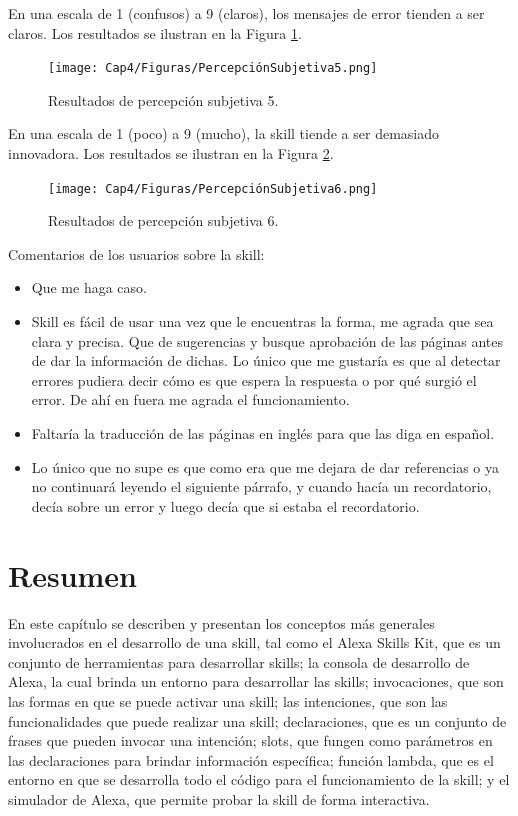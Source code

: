 En una escala de 1 (confusos) a 9 (claros), los mensajes de error tienden a ser claros. Los resultados se ilustran en la Figura \ref{fig:430}.

\begin{figure}[H]
  \centering
  \texttt{[image: Cap4/Figuras/PercepciónSubjetiva5.png]}
  \caption{Resultados de percepción subjetiva 5.}
  \label{fig:430}
\end{figure}

En una escala de 1 (poco) a 9 (mucho), la skill tiende a ser demasiado innovadora. Los resultados se ilustran en la Figura \ref{fig:431}.

\begin{figure}[H]
  \centering
  \texttt{[image: Cap4/Figuras/PercepciónSubjetiva6.png]}
  \caption{Resultados de percepción subjetiva 6.}
  \label{fig:431}
\end{figure}

Comentarios de los usuarios sobre la skill:

\begin{itemize}
  \item Que me haga caso.
  \item Skill es fácil de usar una vez que le encuentras la forma, me agrada que sea clara y precisa. Que de sugerencias y busque aprobación de las páginas antes de dar la información de dichas. Lo único que me gustaría es que al detectar errores pudiera decir cómo es que espera la respuesta o por qué surgió el error. De ahí en fuera me agrada el funcionamiento.
  \item Faltaría la traducción de las páginas en inglés para que las diga en español.
  \item Lo único que no supe es que como era que me dejara de dar referencias o ya no continuará leyendo el siguiente párrafo, y cuando hacía un recordatorio, decía sobre un error y luego decía que si estaba el recordatorio.
\end{itemize}


\section{Resumen}
\label{ResumencapIV}

En este capítulo se describen y presentan los conceptos más generales involucrados en el desarrollo de una skill, tal como el Alexa Skills Kit, que es un conjunto de herramientas para desarrollar skills; la consola de desarrollo de Alexa, la cual brinda un entorno para desarrollar las skills; invocaciones, que son las formas en que se puede activar una skill; las intenciones, que son las funcionalidades que puede realizar una skill; declaraciones, que es un conjunto de frases que pueden invocar una intención;  slots, que fungen como parámetros en las declaraciones para brindar información específica; función lambda, que es el entorno en que se desarrolla todo el código para el funcionamiento de la skill; y el simulador de Alexa, que permite probar la skill de forma interactiva.

